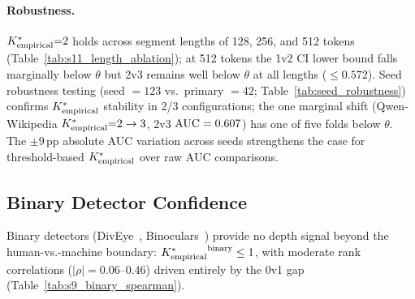 \paragraph{Robustness.}
\label{sec:robustness}
${K^*_{\text{empirical}}}{=}2$ holds across segment lengths of 128, 256, and 512 tokens (Table~\ref{tab:s11_length_ablation}); at 512 tokens the 1v2 CI lower bound falls marginally below $\theta$ but 2v3 remains well below $\theta$ at all lengths ($\leq 0.572$).
Seed robustness testing (seed $= 123$ vs.\ primary $= 42$; Table~\ref{tab:seed_robustness}) confirms ${K^*_{\text{empirical}}}$ stability in 2/3 configurations; the one marginal shift (Qwen-Wikipedia ${K^*_{\text{empirical}}}{=}2 \to 3$, 2v3 $\text{AUC} = 0.607$) has one of five folds below $\theta$.
The ${\pm}9$\,pp absolute AUC variation across seeds strengthens the case for threshold-based ${K^*_{\text{empirical}}}$ over raw AUC comparisons.

\subsection{Binary Detector Confidence}
\label{sec:binary_confidence}

Binary detectors (DivEye~\cite{basani2026diveye}, Binoculars~\cite{hans2024binoculars}) provide no depth signal beyond the human-vs.-machine boundary: ${K^*_{\text{empirical}}}^{\text{binary}} \leq 1$, with moderate rank correlations ($|\rho| = 0.06$--$0.46$) driven entirely by the 0v1 gap (Table~\ref{tab:s9_binary_spearman}).
